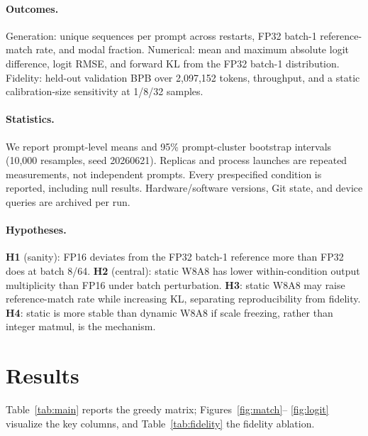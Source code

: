 \documentclass[10pt,twocolumn]{article}
\begin{document}
\paragraph{Outcomes.} Generation: unique sequences per prompt across restarts,
FP32 batch-1 reference-match rate, and modal fraction. Numerical: mean and
maximum absolute logit difference, logit RMSE, and forward KL from the FP32
batch-1 distribution. Fidelity: held-out validation BPB over 2{,}097{,}152 tokens,
throughput, and a static calibration-size sensitivity at 1/8/32 samples.

\paragraph{Statistics.} We report prompt-level means and 95\% prompt-cluster
bootstrap intervals (10{,}000 resamples, seed 20260621). Replicas and process
launches are repeated measurements, not independent prompts. Every prespecified
condition is reported, including null results. Hardware/software versions, Git
state, and device queries are archived per run.

\paragraph{Hypotheses.} \textbf{H1} (sanity): FP16 deviates from the FP32 batch-1
reference more than FP32 does at batch 8/64. \textbf{H2} (central): static W8A8
has lower within-condition output multiplicity than FP16 under batch
perturbation. \textbf{H3}: static W8A8 may raise reference-match rate while
increasing KL, separating reproducibility from fidelity. \textbf{H4}: static is
more stable than dynamic W8A8 if scale freezing, rather than integer matmul, is
the mechanism.

\section{Results}
Table~\ref{tab:main} reports the greedy matrix; Figures~\ref{fig:match}--%
\ref{fig:logit} visualize the key columns, and Table~\ref{tab:fidelity} the
fidelity ablation.

\begin{table}[t]
\centering
\caption{Greedy matrix (1{,}000 generations per row). $|\Delta|$ is absolute
logit difference from the FP32 batch-1 reference; KL is forward KL in nats; BPB
is held-out validation fidelity. Static/dynamic W8A8 use calibration 32.}
\label{tab:main}
\footnotesize
\setlength{\tabcolsep}{3.5pt}

\end{table}
\end{document}
